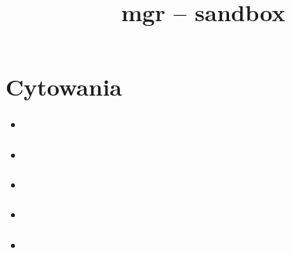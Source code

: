 \documentclass[10pt]{article}
\title{mgr -- sandbox}
\author{}
\date{\relax}
\begin{document}
\section{Cytowania}

\begin{itemize}
\item \cite{typografia}
\item \citep{typografia}
\item \cite[s.~12]{typografia}
\item \citeauthor{typografia}
\item \citeyear{typografia}
\end{itemize}






\end{document}
